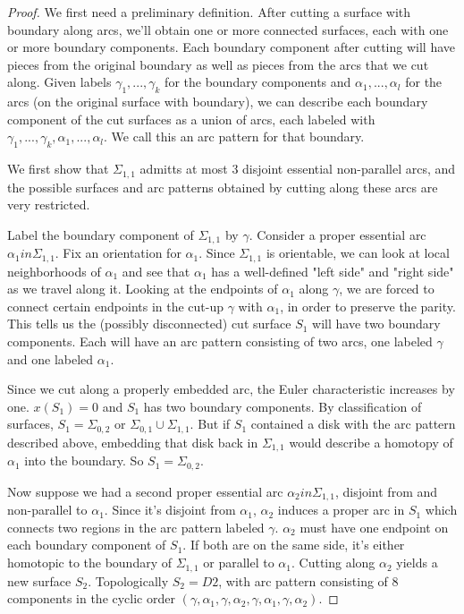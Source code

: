 \documentclass[12pt]{amsart}
\theoremstyle{definition}
\newcommand{\Si}{\Sigma}
\begin{document}
\begin{proof}

We first need a preliminary definition. After cutting a surface with
boundary along arcs, we'll obtain one or more connected surfaces, each with one
or more boundary components. Each boundary component after cutting will have
pieces from the original boundary as well as pieces from the arcs that we cut
along. Given labels $\gamma_1,...,\gamma_k$ for the boundary components and
$\alpha_1,...,\alpha_l$ for the arcs (on the original surface with boundary), we can
describe each boundary component of the cut surfaces as a union of arcs, each
labeled with $\gamma_1,...,\gamma_k,\alpha_1,...,\alpha_l$. We call this an arc pattern
for that boundary.

We first show that $\Si_{1,1}$ admitts at most 3 disjoint essential non-parallel arcs,
and the possible surfaces and arc patterns obtained by cutting along these arcs
are very restricted.

Label the boundary component of $\Si_{1,1}$ by $\gamma$. Consider a proper essential arc
$\alpha_1 in \Si_{1,1}$. Fix an orientation for $\alpha_1$. Since $\Si_{1,1}$ is orientable, we can
look at local neighborhoods of $\alpha_1$ and see that $\alpha_1$ has a well-defined
"left side" and "right side" as we travel along it. Looking at the endpoints of
$\alpha_1$ along $\gamma$, we are forced to connect certain endpoints in the cut-up
$\gamma$ with $\alpha_1$, in order to preserve the parity. This tells us the (possibly
disconnected) cut surface $S_1$ will have two boundary components. Each will have
an arc pattern consisting of two arcs, one labeled $\gamma$ and one labeled
$\alpha_1$.

Since we cut along a properly embedded arc, the Euler characteristic increases
by one. $x(S_1)=0$ and $S_1$ has two boundary components. By classification of
surfaces, $S_1 = \Si_{0,2}$ or $\Si_{0,1} \cup \Si_{1,1}$. But if $S_1$ contained a disk with the arc
pattern described above, embedding that disk back in $\Si_{1,1}$ would describe
a homotopy of $\alpha_1$ into the boundary. So $S_1 = \Si_{0,2}$.

Now suppose we had a second proper essential arc $\alpha_2 in \Si_{1,1}$, disjoint from
and non-parallel to $\alpha_1$. Since it's disjoint from $\alpha_1$, $\alpha_2$ induces
a proper arc in $S_1$ which connects two regions in the arc pattern labeled
$\gamma$.
$\alpha_2$ must have one endpoint on each boundary component of $S_1$. If both are on
the same side, it's either homotopic to the boundary of $\Si_{1,1}$ or parallel to
$\alpha_1$. Cutting along $\alpha_2$ yields a new surface $S_2$. Topologically
$S_2=D2$, with
arc pattern consisting of 8 components in the cyclic order
$(\gamma,\alpha_1,\gamma,\alpha_2,\gamma,\alpha_1,\gamma,\alpha_2)$.


\end{proof}
\end{document}
